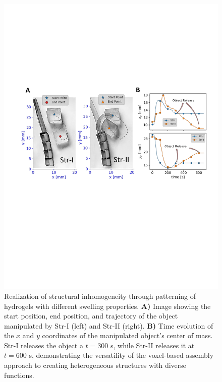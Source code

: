 \begin{figure}[!ht]
\centering
\includegraphics[width=\textwidth]{hardcodedtraj.pdf}
\caption[]{Realization of structural inhomogeneity through patterning of hydrogels with different swelling properties. \textbf{A)} Image showing the start position,  end position, and  trajectory of the  object manipulated by Str-I (left) and Str-II (right). \textbf{B)} Time evolution of the $x$ and $y$ coordinates of the manipulated object's center of mass.  Str-I releases the object   a $t=300$ s, while  Str-II releases it at $t= 600$ s, demonstrating the versatility of the voxel-based assembly approach to creating heterogeneous structures with diverse functions.}
\label{fig:hardcodedtraj}
\end{figure}

